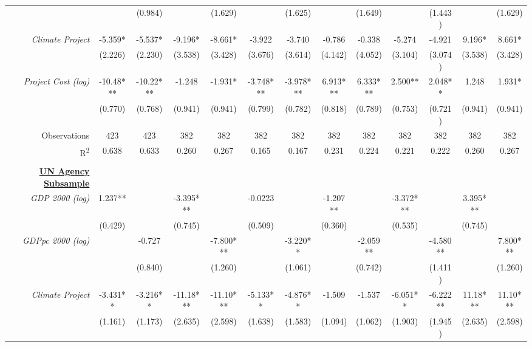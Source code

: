 \documentclass{article}
\begin{document}
\begin{singlespace}
\begin{landscape}
\begin{table}[H]
{\begin{tabular}{rcccccccccccc}
				\textit{} &  & (0.984) &  & (1.629) &  & (1.625) &  & (1.649) &  & (1.443) &  & (1.629) \\
				\textit{Climate Project} & -5.359* & -5.537* & -9.196* & -8.661* & -3.922 & -3.740 & -0.786 & -0.338 & -5.274 & -4.921 & 9.196* & 8.661* \\
				\textit{} & (2.226) & (2.230) & (3.538) & (3.428) & (3.676) & (3.614) & (4.142) & (4.052) & (3.104) & (3.074) & (3.538) & (3.428) \\
				\textit{Project Cost (log)} & -10.48*** & -10.22*** & -1.248 & -1.931* & -3.748*** & -3.978*** & 6.913*** & 6.333*** & 2.500** & 2.048** & 1.248 & 1.931* \\
				\textit{} & (0.770) & (0.768) & (0.941) & (0.941) & (0.799) & (0.782) & (0.818) & (0.789) & (0.753) & (0.721) & (0.941) & (0.941) \\ \hline
				Observations & 423 & 423 & 382 & 382 & 382 & 382 & 382 & 382 & 382 & 382 & 382 & 382 \\
				R\textsuperscript{2} & 0.638 & 0.633 & 0.260 & 0.267 & 0.165 & 0.167 & 0.231 & 0.224 & 0.221 & 0.222 & 0.260 & 0.267 \\ \hline
				\multicolumn{1}{l}{} & \multicolumn{1}{l}{} & \multicolumn{1}{l}{} & \multicolumn{1}{l}{} & \multicolumn{1}{l}{} & \multicolumn{1}{l}{} & \multicolumn{1}{l}{} & \multicolumn{1}{l}{} & \multicolumn{1}{l}{} & \multicolumn{1}{l}{} & \multicolumn{1}{l}{} & \multicolumn{1}{l}{} & \multicolumn{1}{l}{} \\
				{\ul \textbf{UN Agency Subsample}} &  &  &  &  &  &  &  &  &  &  &  &  \\
				\textit{GDP 2000 (log)} & 1.237** &  & -3.395*** &  & -0.0223 &  & -1.207** &  & -3.372*** &  & 3.395*** &  \\
				\textit{} & (0.429) &  & (0.745) &  & (0.509) &  & (0.360) &  & (0.535) &  & (0.745) &  \\
				\textit{GDPpc 2000 (log)} &  & -0.727 &  & -7.800*** &  & -3.220** &  & -2.059** &  & -4.580** &  & 7.800*** \\
				\textit{} &  & (0.840) &  & (1.260) &  & (1.061) &  & (0.742) &  & (1.411) &  & (1.260) \\
				\textit{Climate Project} & -3.431** & -3.216** & -11.18*** & -11.10*** & -5.133** & -4.876** & -1.509 & -1.537 & -6.051** & -6.222** & 11.18*** & 11.10*** \\
				\textit{} & (1.161) & (1.173) & (2.635) & (2.598) & (1.638) & (1.583) & (1.094) & (1.062) & (1.903) & (1.945) & (2.635) & (2.598) \\

\end{tabular}}
\end{table}
\end{landscape}
\end{singlespace}
\end{document}
